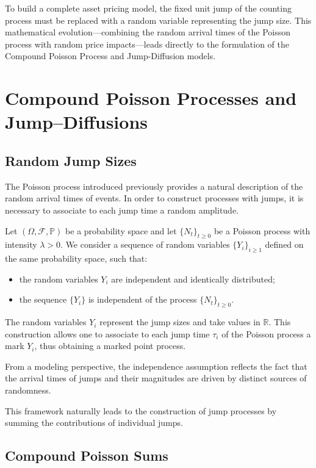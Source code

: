 To build a complete asset pricing model, the fixed unit jump of the counting process must be replaced with a random variable representing the jump size. This mathematical evolution—combining the random arrival times of the Poisson process with random price impacts—leads directly to the formulation of the Compound Poisson Process and Jump-Diffusion models.
\section{Compound Poisson Processes and Jump--Diffusions}
\subsection{Random Jump Sizes}

The Poisson process introduced previously provides a natural description of the random arrival times of events. In order to construct processes with jumps, it is necessary to associate to each jump time a random amplitude.

Let $(\Omega, \mathcal{F}, \mathbb{P})$ be a probability space and let $\{N_t\}_{t \geq 0}$ be a Poisson process with intensity $\lambda > 0$. We consider a sequence of random variables $\{Y_i\}_{i \geq 1}$ defined on the same probability space, such that:

\begin{itemize}[label = --]
    \item the random variables $Y_i$ are independent and identically distributed;
    \item the sequence $\{Y_i\}$ is independent of the process $\{N_t\}_{t \geq 0}$.
\end{itemize}

The random variables $Y_i$ represent the jump sizes and take values in $\mathbb{R}$. This construction allows one to associate to each jump time $\tau_i$ of the Poisson process a mark $Y_i$, thus obtaining a marked point process.

From a modeling perspective, the independence assumption reflects the fact that the arrival times of jumps and their magnitudes are driven by distinct sources of randomness.

\medskip

This framework naturally leads to the construction of jump processes by summing the contributions of individual jumps.
\subsection{Compound Poisson Sums}


